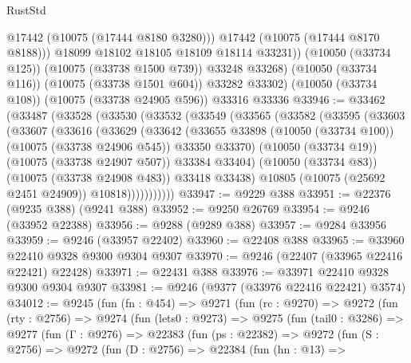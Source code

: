 \begin{lexlean}{RustStd}
\begin{coremodule}
                @17442
                (@10075 (@17444 @8180 @3280)))
              @17442
              (@10075 (@17444 @8170 @8188)))
            @18099
            @18102
            @18105
            @18109
            @18114
            @33231))
        (@10050 (@33734 @125))
        (@10075 (@33738 @1500 @739))
        @33248
        @33268)
      (@10050 (@33734 @116))
      (@10075 (@33738 @1501 @604))
      @33282
      @33302)
    (@10050 (@33734 @108))
    (@10075 (@33738 @24905 @596))
    @33316
    @33336
@33946 := @33462
    (@33487
      (@33528
        (@33530
          (@33532
            (@33549
              (@33565
                (@33582
                  (@33595
                    (@33603
                      (@33607
                        (@33616
                          (@33629
                            (@33642
                              (@33655
                                @33898
                                (@10050 (@33734 @100))
                                (@10075 (@33738 @24906 @545))
                                @33350
                                @33370)
                              (@10050 (@33734 @19))
                              (@10075 (@33738 @24907 @507))
                              @33384
                              @33404)
                            (@10050 (@33734 @83))
                            (@10075 (@33738 @24908 @483))
                            @33418
                            @33438)
                          @10805
                          (@10075 (@25692 @2451 @24909))
                          @10818)))))))))))
@33947 := @9229 @388
@33951 := @22376 (@9235 @388) (@9241 @388)
@33952 := @9250 @26769
@33954 := @9246 (@33952 @22388)
@33956 := @9288 (@9289 @388)
@33957 := @9284 @33956
@33959 := @9246 (@33957 @22402)
@33960 := @22408 @388
@33965 := @33960 @22410 @9328 @9300 @9304 @9307
@33970 := @9246 (@22407 (@33965 @22416 @22421) @22428)
@33971 := @22431 @388
@33976 := @33971 @22410 @9328 @9300 @9304 @9307
@33981 := @9246 (@9377 (@33976 @22416 @22421) @3574)
@34012 := @9245
    (fun (fn : @454) =>
    @9271
      (fun (rc : @9270) =>
      @9272
        (fun (rty : @2756) =>
        @9274
          (fun (lets0 : @9273) =>
          @9275
            (fun (tail0 : @3286) =>
            @9277
              (fun (Γ : @9276) =>
              @22383
                (fun (ps : @22382) =>
                @9272
                  (fun (S : @2756) =>
                  @9272
                    (fun (D : @2756) =>
                    @22384
                      (fun (hn : @13) =>

\end{coremodule}
\end{lexlean}
